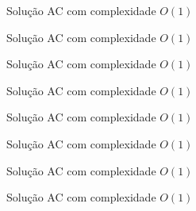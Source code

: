 \begin{frame}[fragile]{Solução AC com complexidade $O(1)$}
\end{frame}

\begin{frame}[fragile]{Solução AC com complexidade $O(1)$}
\end{frame}

\begin{frame}[fragile]{Solução AC com complexidade $O(1)$}
\end{frame}

\begin{frame}[fragile]{Solução AC com complexidade $O(1)$}
\end{frame}

\begin{frame}[fragile]{Solução AC com complexidade $O(1)$}
\end{frame}

\begin{frame}[fragile]{Solução AC com complexidade $O(1)$}
\end{frame}

\begin{frame}[fragile]{Solução AC com complexidade $O(1)$}
\end{frame}

\begin{frame}[fragile]{Solução AC com complexidade $O(1)$}
\end{frame}
